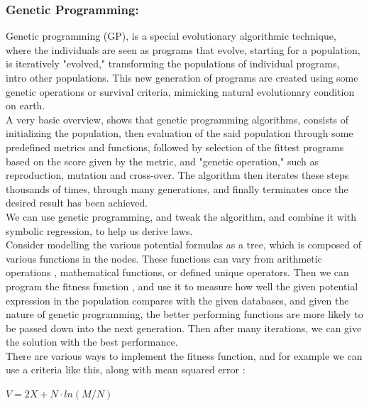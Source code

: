 \documentclass{article}
\begin{document}
\subsubsection{Genetic Programming:}



Genetic programming (GP), is a special evolutionary algorithmic technique, where the individuals are seen as programs that evolve, starting for a population, is iteratively "evolved," transforming the populations of individual programs, intro other populations. This new generation of programs are created using some genetic operations or survival criteria, mimicking natural evolutionary condition on earth.\\ 

A very basic overview, shows that genetic programming algorithms, consists of initializing the population, then evaluation of the said population through some predefined metrics and functions, followed by selection of the fittest programs based on the score given by the metric, and "genetic operation," such as reproduction, mutation and cross-over. The algorithm then iterates these steps thousands of times, through many generations, and finally terminates once the desired result has been achieved.\\

We can use genetic programming, and tweak the algorithm, and combine it with symbolic regression, to help us derive laws. \\

Consider modelling the various potential formulas as a tree, which is composed of various functions in the nodes. These functions can vary from arithmetic operations  , mathematical functions, or defined unique operators. Then we can program the fitness function \cite{Angeline1994}, and use it to measure how well the given potential expression in the population compares with the given databases, and given the nature of genetic programming, the better performing functions are more likely to be passed down into the next generation. Then after many iterations, we can give the solution with the best performance. \\ 

There are various ways to implement the fitness function, and for example we can use a criteria like this, along with mean squared error \cite{Liddle2009}:\\

\begin{center}
  $V = 2X + N \cdot ln(M/N) $
\end{center}
\end{document}
